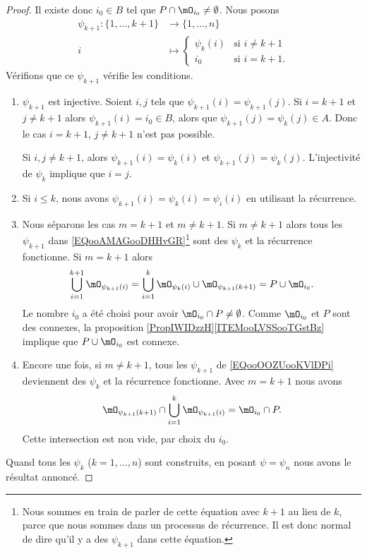 \begin{proof}
	Il existe donc \( i_0\in B\) tel que \( P\cap\mO_{i_0}\neq \emptyset\). Nous posons
	\begin{equation}
		\begin{aligned}
			\psi_{k+1}\colon \{ 1,\ldots, k+1 \} & \to \{ 1,\ldots, n \}               \\
			i                                    & \mapsto \begin{cases}
				\psi_k(i) & \text{si } i\neq k+1 \\
				i_0       & \text{si } i=k+1.
			\end{cases}
		\end{aligned}
	\end{equation}
	Vérifions que ce \( \psi_{k+1}\) vérifie les conditions.
	\begin{enumerate}
		\item
		      \( \psi_{k+1}\) est injective. Soient \( i,j\) tels que \( \psi_{k+1}(i)=\psi_{k+1}(j)\). Si \( i=k+1\) et \( j\neq k+1\) alors \( \psi_{k+1}(i)=i_0\in B\), alors que \( \psi_{k+1}(j)=\psi_k(j)\in A\). Donc le cas \( i=k+1\), \( j\neq k+1\) n'est pas possible.

		      Si \( i,j\neq k+1\), alors \( \psi_{k+1}(i)=\psi_k(i)\) et \( \psi_{k+1}(j)=\psi_k(j)\). L'injectivité de \( \psi_k\) implique que \( i=j\).
		\item
		      Si \( i\leq k\), nous avons \( \psi_{k+1}(i)=\psi_k(i)=\psi_i(i)\) en utilisant la récurrence.
		\item
		      Nous séparons les cas \( m=k+1\) et \( m\neq k+1\). Si \( m\neq k+1\) alors tous les \( \psi_{k+1}\) dans \eqref{EQooAMAGooDHHvGR}\footnote{Nous sommes en train de parler de cette équation avec \( k+1\) au lieu de \( k\), parce que nous sommes dans un processus de récurrence. Il est donc normal de dire qu'il y a des \( \psi_{k+1}\) dans cette équation.} sont des \( \psi_k\) et la récurrence fonctionne. Si \( m=k+1\) alors
		      \begin{equation}
			      \bigcup_{i=1}^{k+1}\mO_{\psi_{k+1}(i)}=\bigcup_{i=1}^k\mO_{\psi_k(i)}\cup\mO_{\psi_{k+1}(k+1)}=P\cup\mO_{i_0}.
		      \end{equation}
		      Le nombre \( i_0\) a été choisi pour avoir \( \mO_{i_0}\cap P\neq \emptyset\). Comme \( \mO_{i_0} \) et \( P\) sont des connexes, la proposition \ref{PropIWIDzzH}\ref{ITEMooLVSSooTGstBz} implique que \( P\cup\mO_{i_0}\) est connexe.
		\item
		      Encore une fois, si \( m\neq k+1\), tous les \( \psi_{k+1}\) de \eqref{EQooOOZUooKVlDPi} deviennent des \( \psi_k\) et la récurrence fonctionne. Avec \( m=k+1\) nous avons
		      \begin{equation}
			      \mO_{\psi_{k+1}(k+1)}\cap\bigcup_{i=1}^k\mO_{\psi_{k+1}(i)}=\mO_{i_0}\cap P.
		      \end{equation}
		      Cette intersection est non vide, par choix du \( i_0\).
	\end{enumerate}
	Quand tous les \( \psi_k\) (\( k=1,\ldots, n\)) sont construits, en posant \( \psi=\psi_n\) nous avons le résultat annoncé.
\end{proof}


